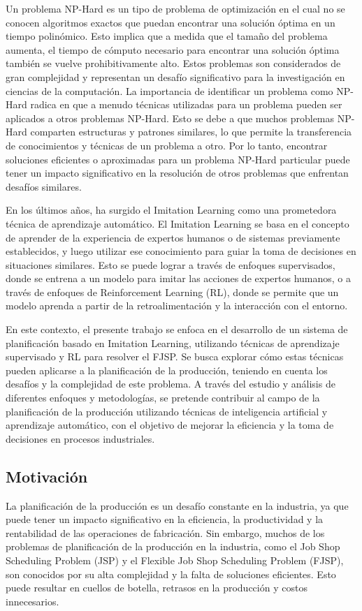 Un problema NP-Hard es un tipo de problema de optimización en el cual no se conocen algoritmos 
exactos que puedan encontrar una solución óptima en un tiempo polinómico. Esto implica que a 
medida que el tamaño del problema aumenta, el tiempo de cómputo necesario para encontrar una 
solución óptima también se vuelve prohibitivamente alto. Estos problemas son considerados de 
gran complejidad y representan un desafío significativo para la investigación en ciencias de 
la computación. La importancia de identificar un problema como NP-Hard radica en que a menudo 
técnicas utilizadas para un problema pueden ser aplicados a otros problemas NP-Hard. Esto se debe a que 
muchos problemas NP-Hard comparten estructuras y patrones similares, lo que permite la 
transferencia de conocimientos y técnicas de un problema a otro. Por lo tanto, encontrar 
soluciones eficientes o aproximadas para un problema NP-Hard particular puede tener un impacto 
significativo en la resolución de otros problemas que enfrentan desafíos similares.\medskip

En los últimos años, ha surgido el Imitation Learning como una prometedora técnica de aprendizaje 
automático. El Imitation Learning se basa en el concepto de aprender de la experiencia de expertos 
humanos o de sistemas previamente establecidos, y luego utilizar ese conocimiento para 
guiar la toma de decisiones en situaciones similares. Esto se puede lograr a través de enfoques 
supervisados, donde se entrena a un modelo para imitar las acciones de expertos humanos, o 
a través de enfoques de Reinforcement Learning (RL), donde se permite que un modelo aprenda a 
partir de la retroalimentación y la interacción con el entorno.\medskip

En este contexto, el presente trabajo se enfoca en el desarrollo de un sistema de planificación 
basado en Imitation Learning, utilizando técnicas de aprendizaje supervisado y RL para resolver el FJSP. 
Se busca explorar cómo estas técnicas pueden aplicarse a la planificación de la producción, teniendo 
en cuenta los desafíos y la complejidad de este problema. A través del estudio y análisis de 
diferentes enfoques y metodologías, se pretende contribuir al campo de la planificación de la 
producción utilizando técnicas de inteligencia artificial y aprendizaje automático, con el objetivo 
de mejorar la eficiencia y la toma de decisiones en procesos industriales.\medskip

\subsection{Motivación}
La planificación de la producción es un desafío constante en la industria, ya que puede tener 
un impacto significativo en la eficiencia, la productividad y la rentabilidad de las operaciones 
de fabricación. Sin embargo, muchos de los problemas de planificación de la producción en la 
industria, como el Job Shop Scheduling Problem (JSP) y el Flexible Job Shop Scheduling Problem (FJSP), 
son conocidos por su alta complejidad y la falta de soluciones eficientes. Esto puede resultar 
en cuellos de botella, retrasos en la producción y costos innecesarios.\medskip

